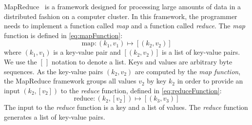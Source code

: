 MapReduce~\citep{dean-ghemawat:2008:ACM} is a framework designed for processing
large amounts of data in a distributed fashion on a computer cluster. In this
framework, the programmer needs to implement a function called \emph{map} and
a function called \emph{reduce}. The \emph{map} function is defined in
\autoref{eq:mapFunction}:
%
\begin{equation}
  \text{map} : (k_1, v_1) \longmapsto [(k_2, v_2)]
  \label{eq:mapFunction}
\end{equation}
%
where $(k_1, v_1)$ is a key-value pair and $[(k_2, v_2)]$ is a list of
key-value pairs. We use the $[ \, ]$ notation to denote a list. Keys and values are arbitrary byte sequences. As the key-value
pairs $(k_2, v_2)$ are computed by the \emph{map function}, the MapReduce framework groups all values $v_2$ by key $k_2$ in order
to provide an input $(k_2, [v_2])$ to the \emph{reduce} function, defined in
\autoref{eq:reduceFunction}:
%
\begin{equation}
  \text{reduce} : (k_2, [v_2]) \longmapsto [(k_3, v_3)]
  \label{eq:reduceFunction}
\end{equation}
%
The input to the \emph{reduce} function is a key and a list of values. The
\emph{reduce} function generates a list of key-value pairs.

